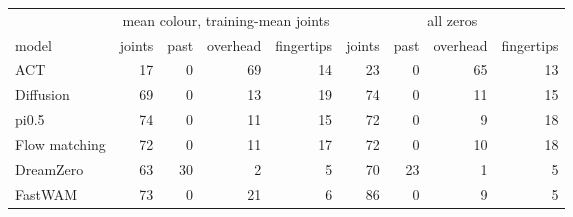 \begin{tabular}{lrrrrrrrr}
\toprule
& \multicolumn{4}{c}{mean colour, training-mean joints} & \multicolumn{4}{c}{all zeros} \\
\cmidrule(lr){2-5}\cmidrule(lr){6-9}
model & joints & past & overhead & fingertips & joints & past & overhead & fingertips \\
\midrule
ACT & 17 & 0 & 69 & 14 & 23 & 0 & 65 & 13 \\
Diffusion & 69 & 0 & 13 & 19 & 74 & 0 & 11 & 15 \\
pi0.5 & 74 & 0 & 11 & 15 & 72 & 0 & 9 & 18 \\
Flow matching & 72 & 0 & 11 & 17 & 72 & 0 & 10 & 18 \\
DreamZero & 63 & 30 & 2 & 5 & 70 & 23 & 1 & 5 \\
FastWAM & 73 & 0 & 21 & 6 & 86 & 0 & 9 & 5 \\
\bottomrule
\end{tabular}
